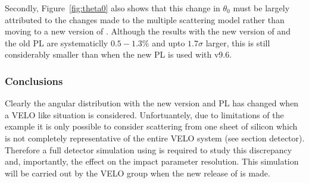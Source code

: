 Secondly, Figure~\ref{fig:theta0} also shows that this change in $\theta_0$ must be largely attributed to the changes made to the multiple scattering model rather than moving to a new version of \geant.  Although the results with the new version of \geant and the old PL are systematiclly $0.5-1.3\%$ and upto $1.7\sigma$ larger, this is still considerably smaller than when the new PL is used with v9.6.

\subsubsection{Conclusions}
\label{sec:Conclusions}
Clearly the angular distribution with the new \geant version and PL has changed when a \lhcb VELO like situation is considered.  Unfortuantely, due to limitations of the \geant example it is only possible to consider scattering from one sheet of silicon which is not completely representative of the entire VELO system (see section detector).  Therefore a full detector simulation using \gauss is required to study this discrepancy and, importantly, the effect on the impact parameter resolution.  This simulation will be carried out by the \lhcb VELO group when the new release of \gauss is made.

\clearpage
